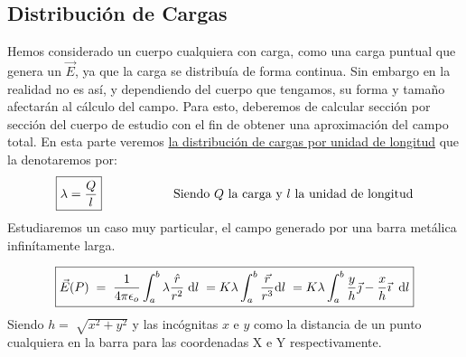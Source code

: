 \subsection{Distribución de Cargas}
Hemos considerado un cuerpo cualquiera con carga, como una carga puntual que genera un \(\vec{E}\), ya que la carga se distribuía de forma continua. Sin embargo en la realidad no es así, y dependiendo del cuerpo que tengamos, su forma y tamaño afectarán al cálculo del campo. Para esto, deberemos de calcular sección por sección del cuerpo de estudio con el fin de obtener una aproximación del campo total. En esta parte veremos \underline{la distribución de cargas por unidad de longitud} que la denotaremos por:
\[ \boxed{\lambda = \frac{Q}{l}} \hspace{2cm} \textnormal{Siendo \(Q\) la carga y \(l\) la unidad de longitud}\]
Estudiaremos un caso muy particular, el campo generado por una barra metálica \\ infinítamente larga.\par
\vspace{0.5cm}
\hspace{4.5cm}
\vspace{0.5cm}
\[
        \boxed{\vec{E}(P) \hspace{1mm} = \hspace{1mm}\frac{1}{4\pi\epsilon_o}\int^{b}_{a} \lambda \frac{\hat{r}}{r^2}\hspace{1mm} \mathrm{d}l \hspace{1mm} = K\lambda \int^{b}_{a}\frac{\vec{r}}{r^3} \mathrm{d}l\hspace{1mm} = K\lambda \int_{a}^{b} \frac{y}{h}\vec{\jmath} -\frac{x}{h} \vec{\imath} \hspace{2mm}\mathrm{d}l}
\]
Siendo \(h = \sqrt[]{x^2+y^2}\) y las incógnitas \(x\) e \(y\) como la distancia de un punto cualquiera en la barra para las coordenadas X e Y respectivamente.
